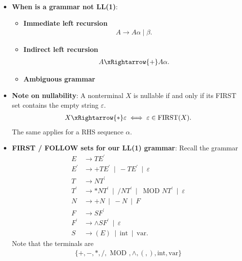 \documentclass{report}
\begin{document}
\begin{itemize}
\begin{enumerate}
            \end{enumerate}
        \item \textbf{When is a grammar not LL(1)}: 
            \begin{itemize}
                \item \textbf{Immediate left recursion}
                    \begin{align*}
                        A \to A\alpha \mid \beta
                    .\end{align*}
                \item \textbf{Indirect left recursion}
                    \begin{align*}
                        A \xRightarrow{+} A\alpha
                    .\end{align*}
                \item \textbf{Ambiguous grammar}
            \end{itemize}
        \item \textbf{Note on nullability}: A nonterminal $X$ is nullable if and only if its FIRST set contains the empty string $\varepsilon$.
            \begin{align*}
                X \xRightarrow{*} \varepsilon \iff \varepsilon \in \text{FIRST}(X)
            .\end{align*}
            The same applies for a RHS sequence $\alpha$.
        \item \textbf{FIRST / FOLLOW sets for our LL(1) grammar}: Recall the grammar
            \begin{align*}
                E &\to TE^{\prime} \\
                E^{\prime} &\to +TE^{\prime} \ \mid \ -TE^{\prime} \ \mid \ \varepsilon \\
                T &\to NT^{\prime} \\
                T^{\prime} &\to *NT^{\prime} \ \mid \ /NT^{\prime} \ \mid \ \text{ MOD } NT^{\prime} \ \mid \ \varepsilon \\
                N &\to +N \ \mid \ -N \ \mid \ F \\
                F &\to SF^{\prime} \\
                F^{\prime} &\to \land SF^{\prime} \ \mid \ \varepsilon\\
                S &\to (E) \ \mid \ \text{int} \ \mid \ \text{var}
            .\end{align*}
            Note that the terminals are
            \begin{align*}
                \{+, -, *, /, \text{ MOD }, \land, (, ), \text{int}, \text{var}\}

\end{align*}
\end{itemize}
\end{document}
